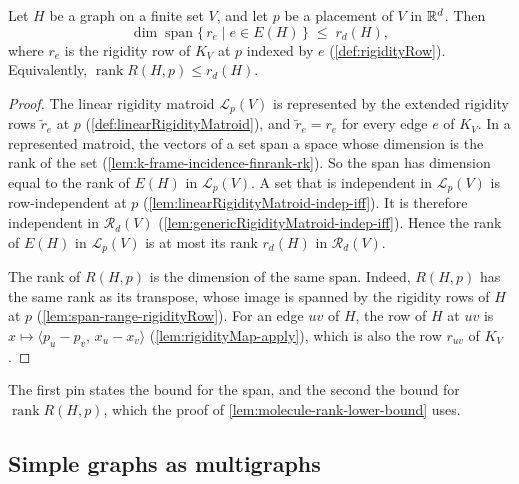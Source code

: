 \begin{lemma}
  \label{lem:square-rank-le-genericRank}
  \leanok
  Let $H$ be a graph on a finite set $V$, and let $p$ be a placement of
  $V$ in ${\mathbb{R}}^d$. Then
  \[
    \dim \operatorname{span} \{\, r_e \mid e \in E(H) \,\} \;\le\; r_d(H),
  \]
  where $r_e$ is the rigidity row of $K_V$ at $p$ indexed by $e$
  (\cref{def:rigidityRow}). Equivalently,
  $\operatorname{rank} R(H, p) \le r_d(H)$.
\end{lemma}
\begin{proof}
  \leanok
  The linear rigidity matroid $\mathcal{L}_p(V)$ is represented by the
  extended rigidity rows $\tilde r_e$ at $p$
  (\cref{def:linearRigidityMatroid}), and $\tilde r_e = r_e$ for every
  edge $e$ of $K_V$. In a represented matroid, the vectors of a set span
  a space whose dimension is the rank of the set
  (\cref{lem:k-frame-incidence-finrank-rk}). So the span has dimension
  equal to the rank of $E(H)$ in $\mathcal{L}_p(V)$. A set that is
  independent in $\mathcal{L}_p(V)$ is row-independent at $p$
  (\cref{lem:linearRigidityMatroid-indep-iff}). It is therefore
  independent in $\mathcal{R}_d(V)$
  (\cref{lem:genericRigidityMatroid-indep-iff}). Hence the rank of $E(H)$
  in $\mathcal{L}_p(V)$ is at most its rank $r_d(H)$ in
  $\mathcal{R}_d(V)$.

  The rank of $R(H, p)$ is the dimension of the same span. Indeed,
  $R(H, p)$ has the same rank as its transpose, whose image is spanned by
  the rigidity rows of $H$ at $p$ (\cref{lem:span-range-rigidityRow}).
  For an edge $uv$ of $H$, the row of $H$ at $uv$ is
  $x \mapsto \langle p_u - p_v,\, x_u - x_v \rangle$
  (\cref{lem:rigidityMap-apply}), which is also the row $r_{uv}$ of
  $K_V$.
\end{proof}

\begin{fmlnote}
  The first pin states the bound for the span, and the second the bound
  for $\operatorname{rank} R(H, p)$, which the proof of
  \cref{lem:molecule-rank-lower-bound} uses.
\end{fmlnote}

\subsection{Simple graphs as multigraphs}
\label{sec:molecule-application-carrier}

